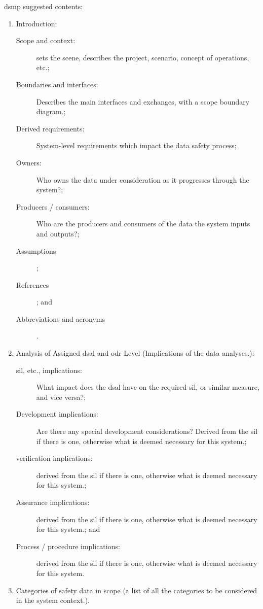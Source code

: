 \Gls{dsmp} suggested contents:
\begin{enumerate}
  \item Introduction:
  \begin{description}
    \item[Scope and context:] sets the scene, describes the project, scenario, concept of operations, etc.;
    \item[Boundaries and interfaces:] Describes the main interfaces and exchanges, with a scope boundary diagram.;
    \item[Derived requirements:] System-level requirements which impact the data safety process;
    \item[Owners:] Who owns the data under consideration as it progresses through the system?;
    \item[Producers / consumers:] Who are the producers and consumers of the data the system inputs and outputs?;
    \item[Assumptions];
    \item[References]; and
    \item[Abbreviations and acronyms].
  \end{description}
  \item Analysis of Assigned \gls{dsal} and \gls{odr} Level (Implications of the data analyses.):
  \begin{description}
    \item[\Gls{sil}, etc., implications:] What impact does the \gls{dsal} have on the required \gls{sil}, or similar measure, and vice versa?;
    \item[Development implications:] Are there any special development considerations? Derived from the \gls{sil} if there is one, otherwise what is deemed necessary for this system.;
    \item[\Gls{verification} implications:] derived from the \gls{sil} if there is one, otherwise what is deemed necessary for this system.;
    \item[Assurance implications:] derived from the \gls{sil} if there is one, otherwise what is deemed necessary for this system.; and
    \item[Process / procedure implications:] derived from the \gls{sil} if there is one, otherwise what is deemed necessary for this system.
  \end{description}
\item
  Categories
  of safety data in scope (a list of all the categories to be considered in the system context.).

\end{enumerate}
